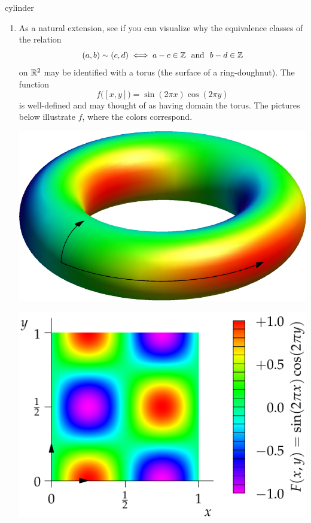 \begin{examples}{}{cylinder}
\begin{enumerate}
	  \item As a natural extension, see if you can visualize why the equivalence classes of the relation
	  \[
			(a,b)\sim (c,d)\iff a-c\in\Z \ \text{ and }\ b-d\in\Z
		\]
		on $\mathbb{R}^2$ may be identified with a torus (the surface of a ring-doughnut). The function
		\[
			f\bigl([x,y]\bigr) =\sin(2\pi x)\cos(2\pi y)
		\]
		is well-defined and may thought of as having domain the torus. The pictures below illustrate $f$, where the colors correspond.\par
		\begin{minipage}[t]{0.49\linewidth}\vspace{-5pt}
			\centering
			\includegraphics[scale=0.9]{relations-14-torus}
		\end{minipage}
		\hfill
		\begin{minipage}[t]{0.49\linewidth}\vspace{-22pt}
			\centering
			\includegraphics[scale=0.7]{relations-14-torus2}
		\end{minipage}
	\end{enumerate}
\end{examples}

